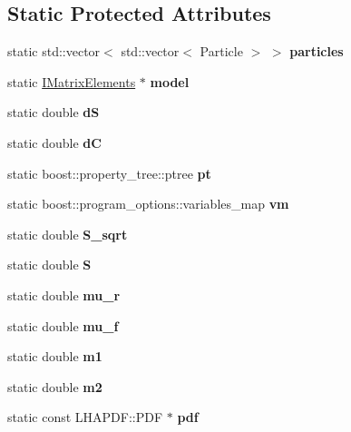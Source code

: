 \subsection*{Static Protected Attributes}
\begin{DoxyCompactItemize}
\item 
\mbox{\label{classXSection_a239a2db2356100d83eafb9026ec5d129}} 
static std\+::vector$<$ std\+::vector$<$ Particle $>$ $>$ {\bfseries particles}
\item 
\mbox{\label{classXSection_ada3e26fe411954e55d36ba3768a7ff79}} 
static \hyperlink{classIMatrixElements}{I\+Matrix\+Elements} $\ast$ {\bfseries model}
\item 
\mbox{\label{classXSection_adda4e44d677508d6f437db1e43db2861}} 
static double {\bfseries dS}
\item 
\mbox{\label{classXSection_ad31c69a4dcde5f7050d627db5ed0475c}} 
static double {\bfseries dC}
\item 
\mbox{\label{classXSection_a50569ac12be53de5400bd51a885b66b8}} 
static boost\+::property\+\_\+tree\+::ptree {\bfseries pt}
\item 
\mbox{\label{classXSection_a9b7d8b14ca35b4d41ee786b125f1cad4}} 
static boost\+::program\+\_\+options\+::variables\+\_\+map {\bfseries vm}
\item 
\mbox{\label{classXSection_a52631134ca09ca4acd54ba712eae6a4a}} 
static double {\bfseries S\+\_\+sqrt}
\item 
\mbox{\label{classXSection_a7f414ef300c0cdc284bd833b473d537a}} 
static double {\bfseries S}
\item 
\mbox{\label{classXSection_aeb6572d9b7a49f9d76e16d81977a95ee}} 
static double {\bfseries mu\+\_\+r}
\item 
\mbox{\label{classXSection_ad85662a63c6a9082be158468618c1cfc}} 
static double {\bfseries mu\+\_\+f}
\item 
\mbox{\label{classXSection_a2a6abdf1668eb3582ca0b92b9720aa0f}} 
static double {\bfseries m1}
\item 
\mbox{\label{classXSection_af1ce6a64797281650b1e3884ab14b685}} 
static double {\bfseries m2}
\item 
\mbox{\label{classXSection_a6ca6de511db7290694dbf23bcd379e6b}} 
static const L\+H\+A\+P\+D\+F\+::\+P\+DF $\ast$ {\bfseries pdf}
\end{DoxyCompactItemize}



